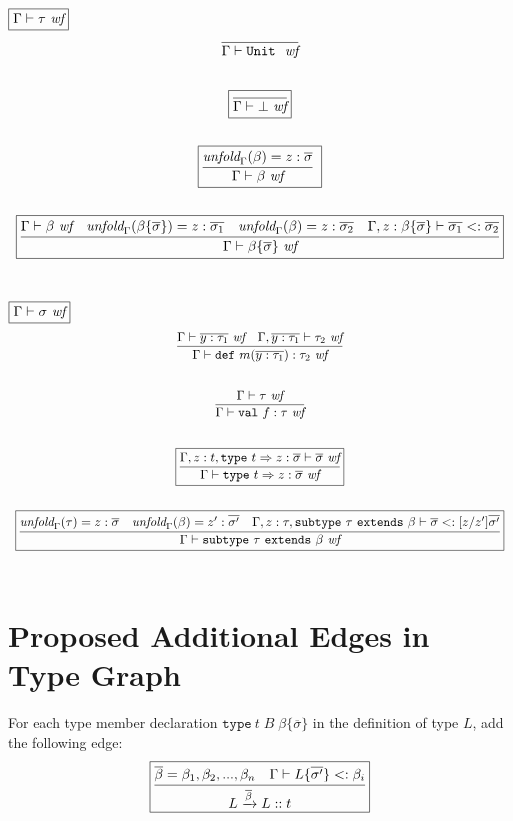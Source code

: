 \documentclass{article}
\newcommand{\keywadj}[1]{\mathtt{#1}}
\newcommand{\keyw}[1]{\keywadj{#1}~}
\begin{document}
$\fbox{$\Gamma \vdash \tau~\textit{wf}$}$
\[
\begin{array}{c}
\infer
  {\Gamma \vdash \keyw{Unit}~\textit{wf}}
  {}\\[5ex]

\boxed{\infer
  {\Gamma \vdash \bot~\textit{wf}}
  {}
}\\[5ex]

\boxed{\infer
  {\Gamma \vdash \beta~\textit{wf}}
  {\textit{unfold}_\Gamma(\beta) = z:\overline{\sigma}}\
}\\[5ex]

\boxed{\infer
  {\Gamma \vdash \beta \{\overline{\sigma}\}~\textit{wf}}
  {\Gamma \vdash \beta ~\textit{wf} & \textit{unfold}_\Gamma(\beta \{\overline{\sigma}\}) = z:\overline{\sigma_1} & \textit{unfold}_\Gamma(\beta) = z:\overline{\sigma_2} & \Gamma, z:\beta \{\overline{\sigma}\}\vdash \overline{\sigma_1} <: \overline{\sigma_2}}
}\\[5ex]
\end{array}
\]

$\fbox{$\Gamma \vdash \sigma~\textit{wf}$}$
\[
\begin{array}{c}
\infer
  {\Gamma \vdash \keyw{def} m(\overline{y : \tau_1}) : \tau_2~\textit{wf}}
  {\Gamma \vdash \overline{y : \tau_1}~\textit{wf} & \Gamma, \overline{y:\tau_1} \vdash \tau_2~\textit{wf}}\\[5ex]

\infer
  {\Gamma \vdash \keyw{val} f : \tau~\textit{wf}}
  {\Gamma \vdash \tau~\textit{wf}}\\[5ex]

\boxed{\infer
  {\Gamma \vdash \keyw{type} t \Rightarrow z: \overline\sigma~\textit{wf}}
  {\Gamma, z: t, \keyw{type} t \Rightarrow z: \overline\sigma \vdash \overline\sigma~\textit{wf}}
}\\[5ex]


\boxed{\infer
  {\Gamma \vdash \keyw{subtype} \tau ~\keyw{extends} \beta~\textit{wf}}
  {\textit{unfold}_\Gamma(\tau) = z:\overline{\sigma} & \textit{unfold}_\Gamma(\beta) = z':\overline{\sigma'} & \Gamma, z:\tau, \keyw{subtype} \tau ~\keyw{extends} \beta \vdash \overline{\sigma} <: [z/z']\overline{\sigma'}}
}\\[5ex]

\end{array}
\]

\section{Proposed Additional Edges in Type Graph}
For each type member declaration $\keyw{type} t \; B \; \beta \{\overline{\sigma}\}$ in the definition of type $L$, add the following edge:
\[
\begin{array}{c}
\boxed{\infer
  {L \xrightarrow{\overline\beta} L::t}
  {\overline\beta = \beta_1,\beta_2,...,\beta_n & \Gamma  \vdash L \{\overline{\sigma'}\} <: \beta_i}
}\\[5ex]

\end{array}
\]




\end{document}
